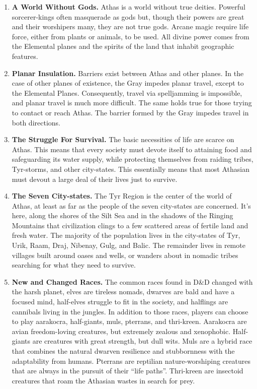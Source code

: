 \begin{enumerate}
\item \textbf{A World Without Gods.} Athas is a world without true deities. Powerful sorcerer-kings often masquerade as gods but, though their powers are great and their worshipers many, they are not true gods. Arcane magic require life force, either from plants or animals, to be used. All divine power comes from the Elemental planes and the spirits of the land that inhabit geographic features.

\item \textbf{Planar Insulation.} Barriers exist between Athas and other planes. In the case of other planes of existence, the Gray impedes planar travel, except to the Elemental Planes. Consequently, travel via spelljamming is impossible, and planar travel is much more difficult. The same holds true for those trying to contact or reach Athas. The barrier formed by the Gray impedes travel in both directions.

\item \textbf{The Struggle For Survival.} The basic necessities of life are scarce on Athas. This means that every society must devote itself to attaining food and safeguarding its water supply, while protecting themselves from raiding tribes, Tyr-storms, and other city-states. This essentially means that most Athasian must devout a large deal of their lives just to survive.

\item \textbf{The Seven City-states.} The Tyr Region is the center of the world of Athas, at least as far as the people of the seven city-states are concerned. It's here, along the shores of the Silt Sea and in the shadows of the Ringing Mountains that civilization clings to a few scattered areas of fertile land and fresh water. The majority of the population lives in the city-states of Tyr, Urik, Raam, Draj, Nibenay, Gulg, and Balic. The remainder lives in remote villages built around oases and wells, or wanders about in nomadic tribes searching for what they need to survive.

\item \textbf{New and Changed Races.} The common races found in D\&D changed with the harsh planet, elves are tireless nomads, dwarves are bald and have a focused mind, half-elves struggle to fit in the society, and halflings are cannibals living in the jungles. In addition to those races, players can choose to play aarakocra, half-giants, muls, pterrans, and thri-kreen. Aarakocra are avian freedom-loving creatures, but extremely zealous and xenophobic. Half-giants are creatures with great strength, but dull wits. Muls are a hybrid race that combines the natural dwarven resilience and stubbornness with the adaptability from humans. Pterrans are reptilian nature-worshiping creatures that are always in the pursuit of their ``life paths''. Thri-kreen are insectoid creatures that roam the Athasian wastes in search for prey.
\end{enumerate}

